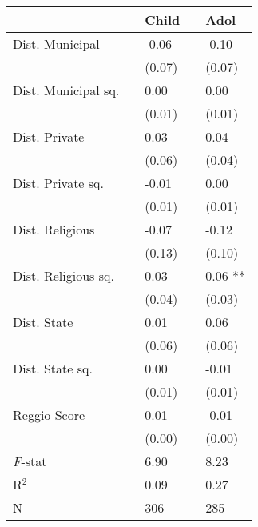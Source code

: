 \begin{tabular}{l L{1cm} l L{1cm} l}
\toprule
 & & Child & & Adol \\
\midrule
Dist. Municipal & & -0.06 & & -0.10 \\
& & (0.07) & & (0.07) \\[5pt]
Dist. Municipal sq. & & 0.00 & & 0.00 \\
& & (0.01) & & (0.01) \\[5pt]
Dist. Private & & 0.03 & & 0.04 \\
& & (0.06) & & (0.04) \\[5pt]
Dist. Private sq. & & -0.01 & & 0.00 \\
& & (0.01) & & (0.01) \\[5pt]
Dist. Religious & & -0.07 & & -0.12 \\
& & (0.13) & & (0.10) \\[5pt]
Dist. Religious sq. & & 0.03 & & 0.06 ** \\
& & (0.04) & & (0.03) \\[5pt]
Dist. State & & 0.01 & & 0.06 \\
& & (0.06) & & (0.06) \\[5pt]
Dist. State sq. & & 0.00 & & -0.01 \\
& & (0.01) & & (0.01) \\[5pt]
Reggio Score & & 0.01 & & -0.01 \\
& & (0.00) & & (0.00) \\[5pt]
\midrule
\textit{F}-stat & & 6.90 & & 8.23 \\
R$^2$ & & 0.09 & & 0.27 \\
N & & 306 & & 285 \\
\bottomrule
\end{tabular}

